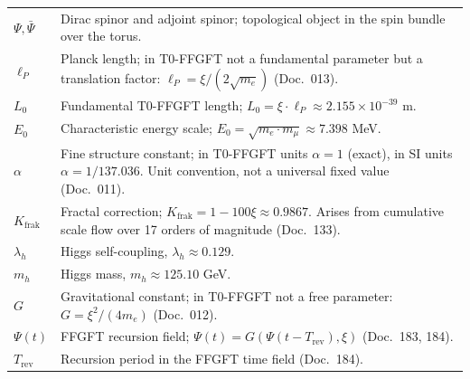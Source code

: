 \begin{longtable}{lp{9.5cm}}
$\Psi, \bar{\Psi}$ & Dirac spinor and adjoint spinor;
        topological object in the spin bundle over the torus. \\[4pt]
$\ell_P$ & Planck length; in T0-FFGFT not a fundamental parameter
        but a translation factor:
        $\ell_P = \xi/(2\sqrt{m_e})$ (Doc.~013). \\[4pt]
$L_0$ & Fundamental T0-FFGFT length;
        $L_0 = \xi \cdot \ell_P \approx 2.155 \times 10^{-39}$ m. \\[4pt]
$E_0$ & Characteristic energy scale;
        $E_0 = \sqrt{m_e \cdot m_\mu} \approx 7.398$ MeV. \\[4pt]
$\alpha$ & Fine structure constant; in T0-FFGFT units $\alpha = 1$
        (exact), in SI units $\alpha = 1/137.036$.
        Unit convention, not a universal fixed value (Doc.~011). \\[4pt]
$K_{\text{frak}}$ & Fractal correction;
        $K_{\text{frak}} = 1 - 100\xi \approx 0.9867$.
        Arises from cumulative scale flow over 17 orders of magnitude
        (Doc.~133). \\[4pt]
$\lambda_h$ & Higgs self-coupling, $\lambda_h \approx 0.129$. \\[4pt]
$m_h$ & Higgs mass, $m_h \approx 125.10$ GeV. \\[4pt]
$G$ & Gravitational constant; in T0-FFGFT not a free parameter:
        $G = \xi^2/(4m_e)$ (Doc.~012). \\[4pt]
$\Psi(t)$ & FFGFT recursion field;
        $\Psi(t) = G(\Psi(t-T_{\mathrm{rev}}), \xi)$ (Doc.~183, 184). \\[4pt]
$T_{\mathrm{rev}}$ & Recursion period in the FFGFT time field (Doc.~184). \\
\bottomrule
\end{longtable}

